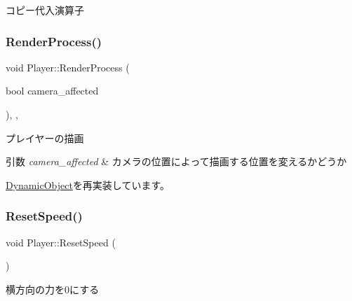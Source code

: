 コピー代入演算子 

\mbox{\label{class_player_a8ac2e54fe5672d32186456b9735c02c3}} 
\subsubsection{\texorpdfstring{Render\+Process()}{RenderProcess()}}
{\footnotesize\ttfamily void Player\+::\+Render\+Process (\begin{DoxyParamCaption}\item[{bool}]{camera\+\_\+affected }\end{DoxyParamCaption})\hspace{0.3cm}{\ttfamily [final]}, {\ttfamily [protected]}, {\ttfamily [virtual]}}



プレイヤーの描画 


\begin{DoxyParams}{引数}
{\em camera\+\_\+affected} & カメラの位置によって描画する位置を変えるかどうか \\
\hline
\end{DoxyParams}


\mbox{\hyperlink{class_dynamic_object_aa7488e1b4dfd7049447535d93d9d6783}{Dynamic\+Object}}を再実装しています。

\mbox{\label{class_player_a6ddf26051788b56dd4029ba851e1f35a}} 
\subsubsection{\texorpdfstring{Reset\+Speed()}{ResetSpeed()}}
{\footnotesize\ttfamily void Player\+::\+Reset\+Speed (\begin{DoxyParamCaption}{ }\end{DoxyParamCaption})\hspace{0.3cm}{\ttfamily [inline]}}



横方向の力を0にする 

\mbox{\label{class_player_a662de093359fb8e4a5bdc86a34fd2549}} 
